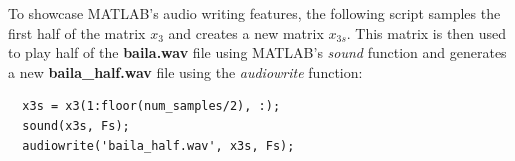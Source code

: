 \documentclass[a4paper, 10pt]{article}
\begin{document}
\hfill

\noindent To showcase MATLAB's audio writing features, the following script samples the first half of the matrix 
$x_3$ and creates a new matrix $x_{3s}$. This matrix is then used to play half of the \textbf{baila.wav} file 
using MATLAB's \textit{sound} function and generates a new \textbf{baila\_half.wav} file using the
\textit{audiowrite} function:
\begin{lstlisting}[style=Matlab-editor, basicstyle=\small\ttfamily]
  %% Get x3s, play it, and create baila_half.wav
  x3s = x3(1:floor(num_samples/2), :);
  sound(x3s, Fs);
  audiowrite('baila_half.wav', x3s, Fs);  
\end{lstlisting}
\end{document}
